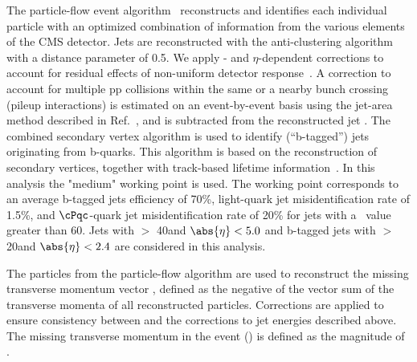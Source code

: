 The particle-flow event algorithm~\cite{CMS-PAS-PFT-09-001,CMS-PAS-PFT-10-001} reconstructs and identifies each individual particle with an optimized combination of information from the various elements of the CMS detector. 
Jets are reconstructed with the anti-\kt clustering
algorithm~\cite{Cacciari:2008gp} with a distance parameter of 0.5. We apply
\pt- and $\eta$-dependent corrections to account for residual
effects of non-uniform detector response~\cite{Chatrchyan:2011ds}.
A correction to account for multiple pp collisions within the same or a nearby
bunch crossing (pileup interactions) is estimated on an event-by-event basis using the
jet-area method described in Ref.~\cite{Cacciari:2007fd}, and is
subtracted from the reconstructed jet \pt.
The combined secondary vertex algorithm is used to identify (``b-tagged'') jets 
originating from b-quarks.  This algorithm 
 is based on the reconstruction of secondary vertices, together with track-based lifetime information~\cite{Chatrchyan:2012jua}. 
In this analysis the "medium" working point is used. The working point corresponds to an average b-tagged jets efficiency of 70\%, 
light-quark jet misidentification rate of 1.5\%, and $\cPqc$-quark jet misidentification rate of 20\% 
for jets with a \pt\ value greater than 60\GeV.
Jets with  \PT $>$ 40\GeV and $\abs{\eta} < 5.0$ and b-tagged jets with \PT $>$ 20\GeV and $\abs{\eta} < 2.4$ are considered in this analysis.


The particles from the particle-flow algorithm are used to reconstruct the missing transverse momentum  vector \ptvecmiss, defined as the negative of the vector sum of the transverse momenta of all reconstructed particles.  Corrections are applied to ensure consistency between
\ptvecmiss and the corrections to jet energies described above.  The missing transverse momentum in the event (\MPT) is defined as the magnitude of \ptvecmiss.

